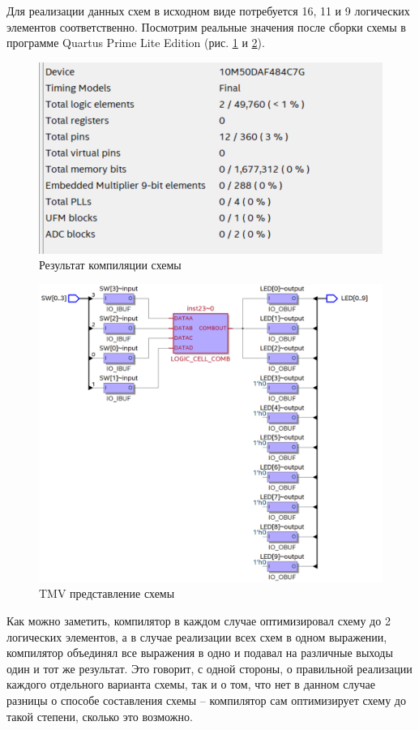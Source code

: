 \documentclass[a4paper,14pt]{article}
\begin{document}
Для реализации данных схем в исходном виде потребуется 16, 11 и 9 логических элементов соответственно.
Посмотрим реальные значения после сборки схемы в программе Quartus Prime Lite Edition (рис. \ref{fig:compilation_report} и \ref{fig:tmv}).


\begin{figure}[H]
	\centering
	\includegraphics[width=0.8\linewidth]{image/compilation_report}
	\caption{Результат компиляции схемы}
	\label{fig:compilation_report}
\end{figure}

\begin{figure}[H]
	\centering
	\includegraphics[width=0.8\linewidth]{image/tmv}
	\caption{TMV представление схемы}
	\label{fig:tmv}
\end{figure}

Как можно заметить, компилятор в каждом случае оптимизировал схему до 2 логических элементов, а в случае реализации всех схем в одном выражении, компилятор объединял все выражения в одно и подавал на различные выходы один и тот же результат. 
Это говорит, с одной стороны, о правильной реализации каждого отдельного варианта схемы, так и о том, что нет в данном случае разницы о способе составления схемы -- компилятор сам оптимизирует схему до такой степени, сколько это возможно.
\end{document}
